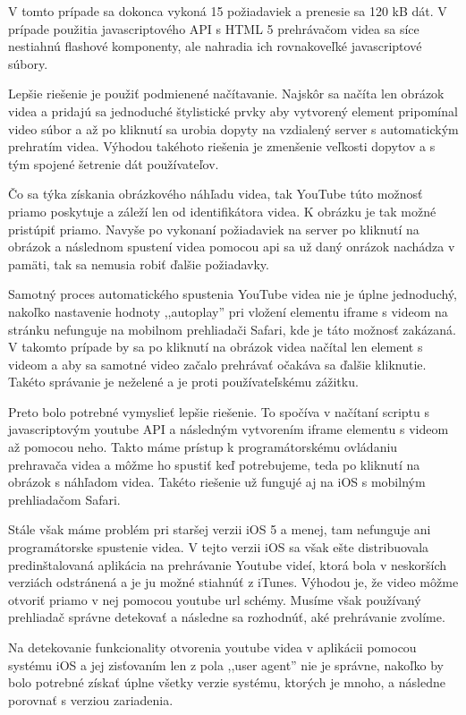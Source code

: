 V tomto prípade sa dokonca vykoná 15 požiadaviek a prenesie sa 120 kB dát. V prípade použitia javascriptového API s HTML 5 prehrávačom videa sa síce nestiahnú flashové komponenty, ale nahradia ich rovnakoveľké javascriptové súbory.

Lepšie riešenie je použiť podmienené načítavanie. Najskôr sa načíta len obrázok videa a pridajú sa jednoduché štylistické prvky aby vytvorený element pripomínal video súbor a až po kliknutí sa urobia dopyty na vzdialený server s automatickým prehratím videa. Výhodou takéhoto riešenia je zmenšenie veľkosti dopytov a s tým spojené šetrenie dát používateľov. 

Čo sa týka získania obrázkového náhľadu videa, tak YouTube túto možnosť priamo poskytuje a záleží len od identifikátora videa. K obrázku je tak možné pristúpiť priamo. Navyše po vykonaní požiadaviek na server po kliknutí na obrázok a následnom spustení videa pomocou api sa už daný onrázok nachádza v pamäti, tak sa nemusia robiť ďalšie požiadavky. 

Samotný proces automatického spustenia YouTube videa nie je úplne jednoduchý, nakoľko nastavenie hodnoty ,,autoplay'' pri vložení elementu iframe s videom na stránku nefunguje na mobilnom prehliadači Safari, kde je táto možnosť zakázaná. V takomto prípade by sa po kliknutí na obrázok videa načítal len element s videom a aby sa samotné video začalo prehrávať očakáva sa ďalšie kliknutie. Takéto správanie je neželené a je proti používateľskému zážitku. 

Preto bolo potrebné vymyslieť lepšie riešenie. To spočíva v načítaní scriptu s javascriptovým youtube API a následným vytvorením iframe elementu s videom až pomocou neho. Takto máme prístup k programátorskému ovládaniu prehravača videa a môžme ho spustiť keď potrebujeme, teda po kliknutí na obrázok s náhľadom videa. Takéto riešenie už fungujé aj na iOS s mobilným prehliadačom Safari.

Stále však máme problém pri staršej verzii iOS 5 a menej, tam nefunguje ani programátorske spustenie videa. V tejto verzii iOS sa však ešte distribuovala predinštalovaná aplikácia na prehrávanie Youtube videí, ktorá bola v neskorších verziách odstránená a je ju možné stiahnúť z iTunes. Výhodou je, že video môžme otvoriť priamo v nej pomocou youtube url schémy. Musíme však používaný prehliadač správne detekovať a následne sa rozhodnúť, aké prehrávanie zvolíme.

Na detekovanie funkcionality otvorenia youtube videa v aplikácii pomocou systému iOS a jej zisťovaním len z pola ,,user agent'' nie je správne, nakoľko by bolo potrebné získať úplne všetky verzie systému, ktorých je mnoho, a následne porovnať s verziou zariadenia.

